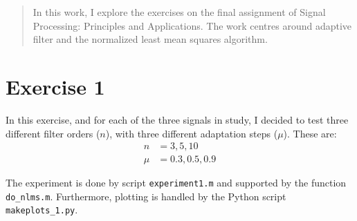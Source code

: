 \begin{abstract}
    In this work, I explore the exercises on the final assignment of Signal
    Processing: Principles and Applications. The work centres around adaptive
    filter and the normalized least mean squares algorithm.
\end{abstract}

\section{Exercise 1}

In this exercise, and for each of the three signals in study, I decided to test
three different filter orders (\(n\)), with three different adaptation steps
(\(\mu\)). These are:
\begin{equation}
    \begin{aligned}
        n   & = {3, 5, 10}      \\
        \mu & = {0.3, 0.5, 0.9}
    \end{aligned}
\end{equation}

The experiment is done by script {\tt experiment1.m} and supported by the function
    {\tt do\_nlms.m}. Furthermore, plotting is handled by the Python script {\tt
        makeplots\_1.py}.

